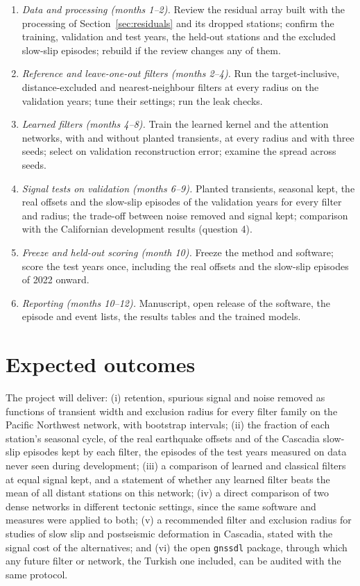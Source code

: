 \documentclass[preprint,12pt,authoryear]{elsarticle}
\begin{document}
\begin{enumerate}
  \item \emph{Data and processing (months 1--2).} Review the residual array built with the processing of Section~\ref{sec:residuals} and its dropped stations; confirm the training, validation and test years, the held-out stations and the excluded slow-slip episodes; rebuild if the review changes any of them.
  \item \emph{Reference and leave-one-out filters (months 2--4).} Run the target-inclusive, distance-excluded and nearest-neighbour filters at every radius on the validation years; tune their settings; run the leak checks.
  \item \emph{Learned filters (months 4--8).} Train the learned kernel and the attention networks, with and without planted transients, at every radius and with three seeds; select on validation reconstruction error; examine the spread across seeds.
  \item \emph{Signal tests on validation (months 6--9).} Planted transients, seasonal kept, the real offsets and the slow-slip episodes of the validation years for every filter and radius; the trade-off between noise removed and signal kept; comparison with the Californian development results (question 4).
  \item \emph{Freeze and held-out scoring (month 10).} Freeze the method and software; score the test years once, including the real offsets and the slow-slip episodes of 2022 onward.
  \item \emph{Reporting (months 10--12).} Manuscript, open release of the software, the episode and event lists, the results tables and the trained models.
\end{enumerate}

\section{Expected outcomes}
\label{sec:outcomes}

The project will deliver: (i) retention, spurious signal and noise removed as functions of transient width and exclusion radius for every filter family on the Pacific Northwest network, with bootstrap intervals; (ii) the fraction of each station's seasonal cycle, of the real earthquake offsets and of the Cascadia slow-slip episodes kept by each filter, the episodes of the test years measured on data never seen during development; (iii) a comparison of learned and classical filters at equal signal kept, and a statement of whether any learned filter beats the mean of all distant stations on this network; (iv) a direct comparison of two dense networks in different tectonic settings, since the same software and measures were applied to both; (v) a recommended filter and exclusion radius for studies of slow slip and postseismic deformation in Cascadia, stated with the signal cost of the alternatives; and (vi) the open \texttt{gnssdl} package, through which any future filter or network, the Turkish one included, can be audited with the same protocol.
\end{document}
